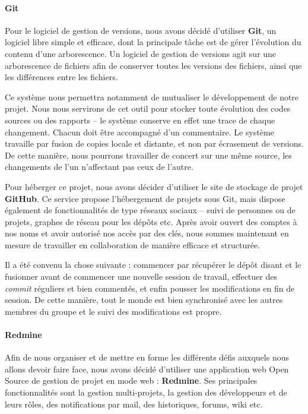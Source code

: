 \paragraph*{Git\\}
\medskip Pour le logiciel de gestion de versions, nous avons décidé d'utiliser \textbf{Git}, un logiciel libre simple et efficace, dont la principale tâche est de gérer l'évolution du contenu d'une arborescence. Un logiciel de gestion de versions agit sur une arborescence de fichiers afin de conserver toutes les versions des fichiers, ainsi que les différences entre les fichiers.

Ce système nous permettra notamment de mutualiser le développement de notre projet. Nous nous servirons de cet outil pour stocker toute évolution des codes sources ou des rapports -- le système conserve en effet une trace de chaque changement. Chacun doit être accompagné d'un commentaire. Le système travaille par fusion de copies locale et distante, et non par écrasement de versions. De cette manière, nous pourrons travailler de concert sur une même source, les changements de l'un n'affectant pas ceux de l'autre.

Pour héberger ce projet, nous avons décider d'utiliser le site de stockage de projet \textbf{GitHub}. Ce service propose l'hébergement de projets sous Git, mais dispose également de fonctionnalités de type réseaux sociaux -- suivi de personnes ou de projets, graphes de réseau pour les dépôts etc. Après avoir ouvert des comptes à nos noms et avoir autorisé nos accès par des clés, nous sommes maintenant en mesure de travailler en collaboration de manière efficace et structurée.

Il a été convenu la chose suivante : commencer par récupérer le dépôt disant et le fusionner avant de commencer une nouvelle session de travail, effectuer des \textit{commit} réguliers et bien commentés, et enfin pousser les modifications en fin de session. De cette manière, tout le monde est bien synchronisé avec les autres membres du groupe et le suivi des modifications est propre.

\paragraph*{Redmine\\}
Afin de nous organiser et de mettre en forme les différents défis auxquels nous allons devoir faire face, nous avons décidé d'utiliser une application web Open Source de gestion de projet en mode web : \textbf{Redmine}. Ses principales fonctionnalités sont la gestion multi-projets, la gestion des développeurs et de leurs rôles, des notifications par mail, des historiques, forums, wiki etc.


